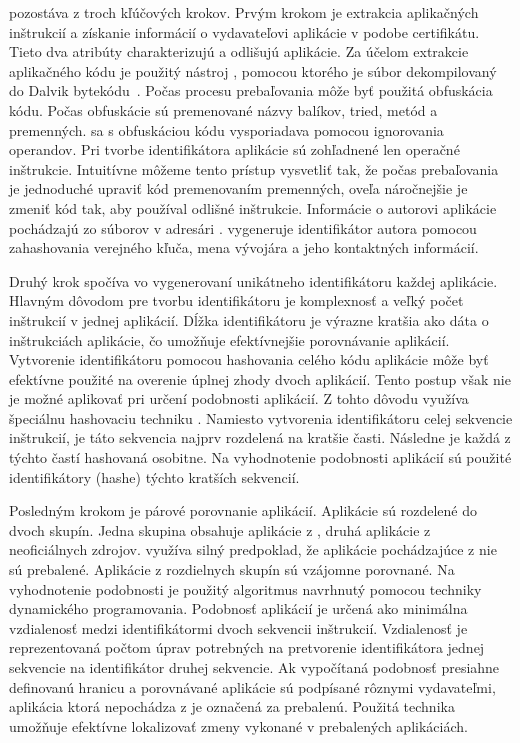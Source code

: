  pozostáva z troch kľúčových krokov. Prvým krokom je extrakcia aplikačných inštrukcií a získanie informácií o vydavateľovi aplikácie v podobe certifikátu. Tieto dva atribúty charakterizujú a odlišujú aplikácie.
Za účelom extrakcie aplikačného kódu je použitý nástroj , pomocou ktorého je súbor  dekompilovaný do Dalvik bytekódu~\cite{smali}.  Počas procesu prebaľovania môže byť použitá obfuskácia kódu. Počas obfuskácie sú premenované názvy balíkov, tried, metód a premenných.  sa s obfuskáciou kódu vysporiadava pomocou ignorovania operandov. Pri tvorbe identifikátora aplikácie sú zohľadnené len operačné inštrukcie. Intuitívne môžeme tento prístup vysvetliť tak, že počas prebaľovania je jednoduché upraviť kód premenovaním premenných, oveľa náročnejšie je zmeniť kód tak, aby používal odlišné inštrukcie. 
Informácie o autorovi aplikácie pochádzajú zo súborov v adresári .  vygeneruje identifikátor autora pomocou zahashovania verejného kľuča, mena vývojára a jeho kontaktných informácií. 

Druhý krok spočíva vo vygenerovaní unikátneho identifikátoru každej aplikácie. Hlavným dôvodom pre tvorbu identifikátoru je komplexnosť a veľký počet inštrukcií v jednej aplikácií. Dĺžka identifikátoru je výrazne kratšia ako dáta o inštrukciách aplikácie, čo umožňuje efektívnejšie porovnávanie aplikácií. 
Vytvorenie identifikátoru pomocou hashovania celého kódu aplikácie môže byť efektívne použité na overenie úplnej zhody dvoch aplikácií. Tento postup však nie je možné aplikovať pri určení podobnosti aplikácií.  Z tohto dôvodu využíva  špeciálnu hashovaciu techniku  \cite{fuzzyHashing}. Namiesto vytvorenia identifikátoru celej sekvencie inštrukcií, je táto sekvencia najprv rozdelená na kratšie časti. Následne je každá z týchto častí hashovaná osobitne. Na vyhodnotenie podobnosti aplikácií sú použité identifikátory (hashe) týchto kratších sekvencií.

Posledným krokom je párové porovnanie aplikácií. Aplikácie sú  rozdelené do dvoch skupín. Jedna skupina obsahuje aplikácie z , druhá aplikácie z neoficiálnych zdrojov.   využíva silný predpoklad, že aplikácie pochádzajúce z  nie sú prebalené. 
Aplikácie z rozdielnych skupín sú vzájomne porovnané. Na vyhodnotenie podobnosti je použitý algoritmus navrhnutý pomocou techniky dynamického programovania. Podobnosť aplikácií je určená ako minimálna vzdialenosť medzi identifikátormi dvoch sekvencii inštrukcií.  Vzdialenosť je reprezentovaná počtom úprav potrebných na pretvorenie identifikátora jednej sekvencie na identifikátor druhej sekvencie. Ak vypočítaná podobnosť presiahne definovanú hranicu a porovnávané aplikácie sú podpísané rôznymi vydavateľmi, aplikácia ktorá nepochádza z  je označená za prebalenú. Použitá technika umožňuje efektívne lokalizovať zmeny vykonané v prebalených aplikáciách. 

